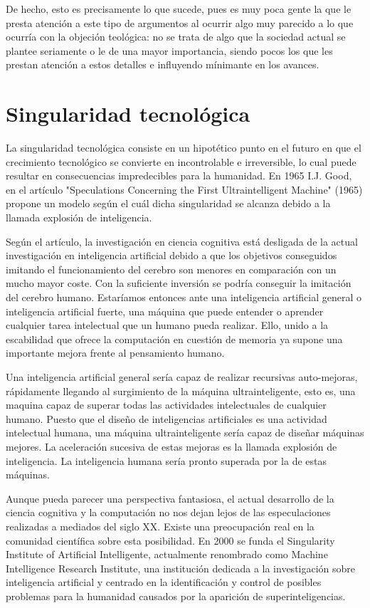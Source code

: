 \documentclass[12pt,a4paper]{article}
\begin{document}
De hecho, esto es precisamente lo que sucede, pues es muy poca gente la que le presta atención a este tipo de argumentos al ocurrir algo muy parecido a lo que ocurría con la objeción teológica: no se trata de algo que la sociedad actual se plantee seriamente o le de una mayor importancia, siendo pocos los que les prestan atención a estos detalles e influyendo mínimante en los avances.

\section{Singularidad tecnológica}

La singularidad tecnológica consiste en un hipotético punto en el futuro en que el crecimiento tecnológico se convierte en incontrolable e irreversible, lo cual puede resultar en consecuencias impredecibles para la humanidad. En 1965 I.J. Good, en el artículo "Speculations Concerning the First Ultraintelligent Machine" (1965) propone un modelo según el cuál dicha singularidad se alcanza debido a la llamada explosión de inteligencia.

Según el artículo, la investigación en ciencia cognitiva está desligada de la actual investigación en inteligencia artificial debido a que los objetivos conseguidos imitando el funcionamiento del cerebro son menores en comparación con un mucho mayor coste. Con la suficiente inversión se podría conseguir la imitación del cerebro humano. Estaríamos entonces ante una inteligencia artificial general o inteligencia artificial fuerte, una máquina que puede entender o aprender cualquier tarea intelectual que un humano pueda realizar. Ello, unido a la escabilidad que ofrece la computación en cuestión de memoria ya supone una importante mejora frente al pensamiento humano.

Una inteligencia artificial general sería capaz de realizar recursivas auto-mejoras, rápidamente llegando al surgimiento de la máquina ultrainteligente, esto es, una maquina capaz de superar todas las actividades intelectuales de cualquier humano. Puesto que el diseño de inteligencias artificiales es una actividad intelectual humana, una máquina ultrainteligente sería capaz de diseñar máquinas mejores. La aceleración sucesiva de estas mejoras es la llamada explosión de inteligencia. La inteligencia humana sería pronto superada por la de estas máquinas.

Aunque pueda parecer una perspectiva fantasiosa, el actual desarrollo de la ciencia cognitiva y la computación no nos dejan lejos de las especulaciones realizadas a mediados del siglo XX. Existe una preocupación real en la comunidad científica sobre esta posibilidad. En 2000 se funda el Singularity Institute of Artificial Intelligente, actualmente renombrado como Machine Intelligence Research Institute, una institución dedicada a la investigación sobre inteligencia artificial y centrado en la identificación y control de posibles problemas para la humanidad causados por la aparición de superinteligencias.
\end{document}
